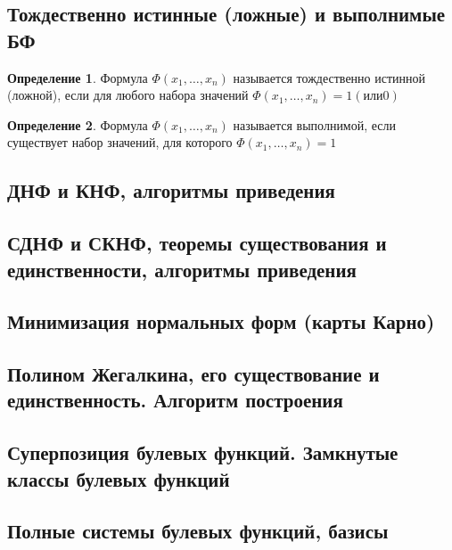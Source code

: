 \documentclass[a4paper]{article}
\theoremstyle{definition}
\newtheorem*{definition}{Определение}
\theoremstyle{remark}
\begin{document}
    \subsection{Тождественно истинные (ложные) и выполнимые БФ}
    \begin{definition}
        Формула $\Phi(x_1, \dots, x_n)$ называется тождественно истинной
        (ложной), если для любого набора значений $\Phi(x_1, \dots, x_n) = 1 (или 0)$
    \end{definition}
    \begin{definition}
        Формула $\Phi(x_1, \dots, x_n)$ называется выполнимой, если
        существует набор значений, для которого $\Phi(x_1, \dots, x_n) = 1$
    \end{definition}
    \subsection{ДНФ и КНФ, алгоритмы приведения}
    \subsection{СДНФ и СКНФ, теоремы существования и единственности, алгоритмы приведения}
    \subsection{Минимизация нормальных форм (карты Карно)}
    \subsection{Полином Жегалкина, его существование и единственность. Алгоритм построения}
    \subsection{Суперпозиция булевых функций. Замкнутые классы булевых функций}
    \subsection{Полные системы булевых функций, базисы}
\end{document}
